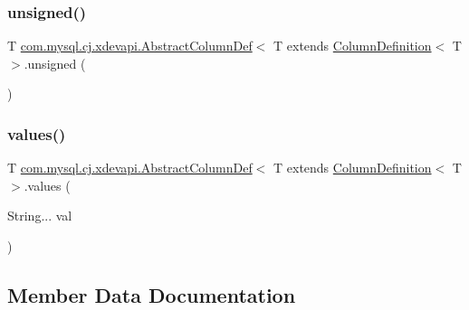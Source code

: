 \subsubsection{\texorpdfstring{unsigned()}{unsigned()}}
{\footnotesize\ttfamily T \mbox{\hyperlink{classcom_1_1mysql_1_1cj_1_1xdevapi_1_1_abstract_column_def}{com.\+mysql.\+cj.\+xdevapi.\+Abstract\+Column\+Def}}$<$ T extends \mbox{\hyperlink{interfacecom_1_1mysql_1_1cj_1_1protocol_1_1_column_definition}{Column\+Definition}}$<$ T $>$.unsigned (\begin{DoxyParamCaption}{ }\end{DoxyParamCaption})}

\mbox{\label{classcom_1_1mysql_1_1cj_1_1xdevapi_1_1_abstract_column_def_a707a799028bb4075fae6548a272cc310}} 
\subsubsection{\texorpdfstring{values()}{values()}}
{\footnotesize\ttfamily T \mbox{\hyperlink{classcom_1_1mysql_1_1cj_1_1xdevapi_1_1_abstract_column_def}{com.\+mysql.\+cj.\+xdevapi.\+Abstract\+Column\+Def}}$<$ T extends \mbox{\hyperlink{interfacecom_1_1mysql_1_1cj_1_1protocol_1_1_column_definition}{Column\+Definition}}$<$ T $>$.values (\begin{DoxyParamCaption}\item[{String...}]{val }\end{DoxyParamCaption})}



\subsection{Member Data Documentation}
\mbox{\label{classcom_1_1mysql_1_1cj_1_1xdevapi_1_1_abstract_column_def_abc425b280afa935ee2a8973bc1d2d85a}} 
